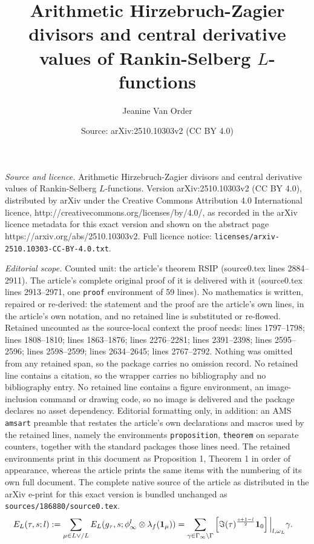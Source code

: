 \documentclass[10pt,a4paper]{amsart}
\title{Arithmetic Hirzebruch-Zagier divisors and central derivative values of Rankin-Selberg $L$-functions}
\author{Jeanine Van Order}
\date{Source: arXiv:2510.10303v2 (CC BY 4.0)}
\begin{document}
\maketitle

\noindent\emph{Source and licence.} Arithmetic Hirzebruch-Zagier divisors and central derivative values of Rankin-Selberg $L$-functions. Version arXiv:2510.10303v2 (CC BY 4.0), distributed by arXiv under the Creative Commons Attribution 4.0 International licence, http://creativecommons.org/licenses/by/4.0/, as recorded in the arXiv licence metadata for this exact version and shown on the abstract page https://arxiv.org/abs/2510.10303v2. Full licence notice: \texttt{licenses/arxiv-2510.10303-CC-BY-4.0.txt}.\par\smallskip

\noindent\textit{Editorial scope.} Counted unit: the article's theorem RSIP (source0.tex lines 2884--2911). The article's complete original proof of it is delivered with it (source0.tex lines 2913--2971, one \texttt{proof} environment of 59 lines). No mathematics is written, repaired or re-derived: the statement and the proof are the article's own lines, in the article's own notation, and no retained line is substituted or re-flowed.  Retained uncounted as the source-local context the proof needs: lines 1797--1798; lines 1808--1810; lines 1863--1876; lines 2276--2281; lines 2391--2398; lines 2595--2596; lines 2598--2599; lines 2634--2645; lines 2767--2792.  Nothing was omitted from any retained span, so the package carries no omission record.  No retained line contains a citation, so the wrapper carries no bibliography and no bibliography entry.  No retained line contains a figure environment, an image-inclusion command or drawing code, so no image is delivered and the package declares no asset dependency.  Editorial formatting only, in addition: an AMS \texttt{amsart} preamble that restates the article's own declarations and macros used by the retained lines, namely the environments \texttt{proposition}, \texttt{theorem} on separate counters, together with the standard packages those lines need.  The retained environments print in this document as Proposition 1, Theorem 1 in order of appearance, whereas the article prints the same items with the numbering of its own full document.  The complete native source of the article as distributed in the arXiv e-print for this exact version is bundled unchanged as \texttt{sources/186880/source0.tex}.
\begin{align}\label{E-classical} E_L(\tau, s; l) := \sum\limits_{ \mu \in L{\vee}/L} E_L(g_{\tau}, s; \phi_{\infty}^l \otimes \lambda_f({\bf{1}}_{\mu}))
&= \sum\limits_{ \gamma \in \Gamma_{\infty} \backslash \Gamma } \left[ \Im(\tau)^{\frac{s + 1 - l}{2}} {\bf{1}}_0 \right] \Big\vert_{l, \omega_{L}} \gamma. \end{align}
\end{document}
